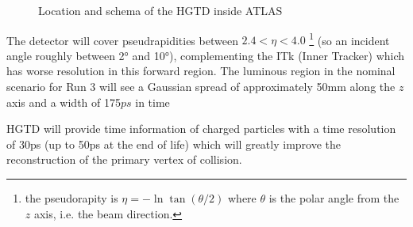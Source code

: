  
\begin{figure}[!ht]
    \centering
    \hfill
    \centering
    \caption{Location and schema of the HGTD inside ATLAS}
\end{figure}

The detector will cover pseudrapidities between $2.4 < \eta < 4.0$ \footnote{the pseudorapity is $\eta=-\ln \tan(\theta/2)$ where $\theta$ is the polar angle from the $z$ axis, i.e. the beam direction.} (so an incident angle roughly between 2° and 10°), complementing the ITk (Inner Tracker) which has worse resolution in this forward region. The luminous region in the nominal scenario for Run 3 will see a Gaussian spread of approximately 50mm along the $z$ axis and a width of 175$\si{ps}$ in time %


HGTD will provide time information of charged particles with a time resolution of 30ps (up to 50ps at the end of life) which will greatly improve the reconstruction of the primary vertex of collision.


